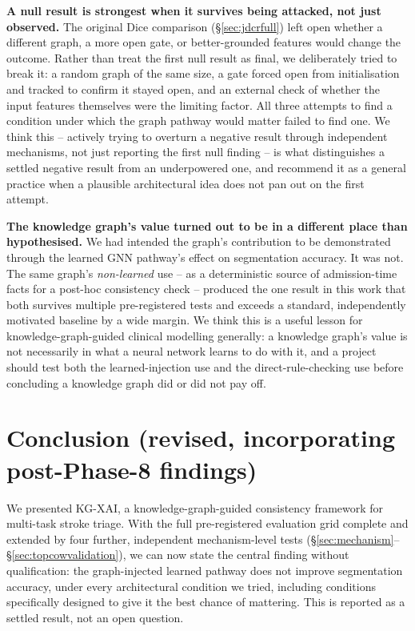 \textbf{A null result is strongest when it survives being attacked, not just observed.} The original Dice comparison (\S\ref{sec:jdcrfull}) left open whether a different graph, a more open gate, or better-grounded features would change the outcome. Rather than treat the first null result as final, we deliberately tried to break it: a random graph of the same size, a gate forced open from initialisation and tracked to confirm it stayed open, and an external check of whether the input features themselves were the limiting factor. All three attempts to find a condition under which the graph pathway would matter failed to find one. We think this -- actively trying to overturn a negative result through independent mechanisms, not just reporting the first null finding -- is what distinguishes a settled negative result from an underpowered one, and recommend it as a general practice when a plausible architectural idea does not pan out on the first attempt.

\textbf{The knowledge graph's value turned out to be in a different place than hypothesised.} We had intended the graph's contribution to be demonstrated through the learned GNN pathway's effect on segmentation accuracy. It was not. The same graph's \emph{non-learned} use -- as a deterministic source of admission-time facts for a post-hoc consistency check -- produced the one result in this work that both survives multiple pre-registered tests and exceeds a standard, independently motivated baseline by a wide margin. We think this is a useful lesson for knowledge-graph-guided clinical modelling generally: a knowledge graph's value is not necessarily in what a neural network learns to do with it, and a project should test both the learned-injection use and the direct-rule-checking use before concluding a knowledge graph did or did not pay off.


\section*{Conclusion (revised, incorporating post-Phase-8 findings)}
We presented KG-XAI, a knowledge-graph-guided consistency framework for multi-task stroke triage. With the full pre-registered evaluation grid complete and extended by four further, independent mechanism-level tests (\S\ref{sec:mechanism}--\S\ref{sec:topcowvalidation}), we can now state the central finding without qualification: the graph-injected learned pathway does not improve segmentation accuracy, under every architectural condition we tried, including conditions specifically designed to give it the best chance of mattering. This is reported as a settled result, not an open question.

